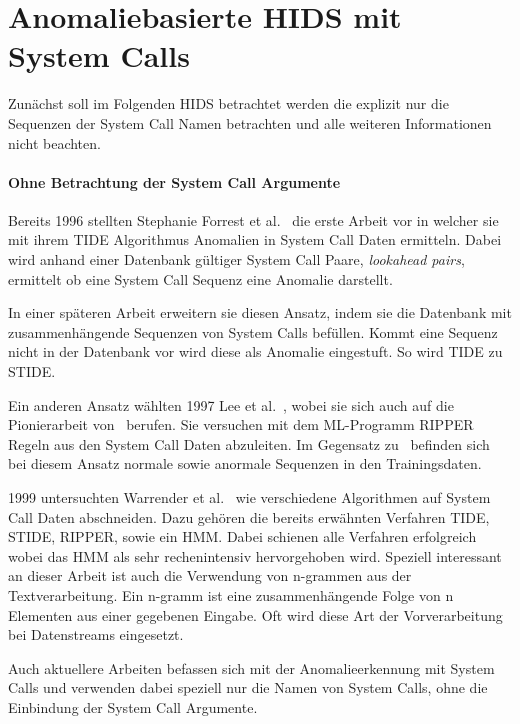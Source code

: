\section{Anomaliebasierte HIDS mit System Calls}

    Zunächst soll im Folgenden \ac{HIDS} betrachtet werden die explizit nur die Sequenzen der System Call Namen betrachten und alle weiteren Informationen nicht beachten.

    \paragraph{Ohne Betrachtung der System Call Argumente}
        Bereits 1996 stellten Stephanie Forrest et al.~\cite{FORREST} die erste Arbeit vor in welcher sie mit ihrem \ac{TIDE} Algorithmus Anomalien in System Call Daten ermitteln.
        Dabei wird anhand einer Datenbank gültiger System Call Paare, \textit{lookahead pairs}, ermittelt ob eine System Call Sequenz eine Anomalie darstellt.

        In einer späteren Arbeit erweitern sie diesen Ansatz, indem sie die Datenbank mit zusammenhängende Sequenzen von System Calls befüllen.
        Kommt eine Sequenz nicht in der Datenbank vor wird diese als Anomalie eingestuft.
        So wird \ac{TIDE} zu \ac{STIDE}.~\cite{STIDE}

        Ein anderen Ansatz wählten 1997 Lee et al.~\cite{LEE1997}, wobei sie sich auch auf die Pionierarbeit von~\cite{FORREST} berufen.
        Sie versuchen mit dem \ac{ML}-Programm \ac{RIPPER} Regeln aus den System Call Daten abzuleiten.
        Im Gegensatz zu~\cite{FORREST} befinden sich bei diesem Ansatz normale sowie anormale Sequenzen in den Trainingsdaten.

        1999 untersuchten Warrender et al.~\cite{STIDE_Alternatives} wie verschiedene Algorithmen auf System Call Daten abschneiden.
        Dazu gehören die bereits erwähnten Verfahren \ac{TIDE}, \ac{STIDE}, \ac{RIPPER}, sowie ein \ac{HMM}.
        Dabei schienen alle Verfahren erfolgreich wobei das \ac{HMM} als sehr rechenintensiv hervorgehoben wird.
        Speziell interessant an dieser Arbeit ist auch die Verwendung von n-grammen aus der Textverarbeitung.
        Ein n-gramm ist eine zusammenhängende Folge von n Elementen aus einer gegebenen Eingabe.
        Oft wird diese Art der Vorverarbeitung bei Datenstreams eingesetzt.
 
        Auch aktuellere Arbeiten befassen sich mit der Anomalieerkennung mit System Calls und verwenden dabei speziell nur die Namen von System Calls, ohne die Einbindung der System Call Argumente.
    
